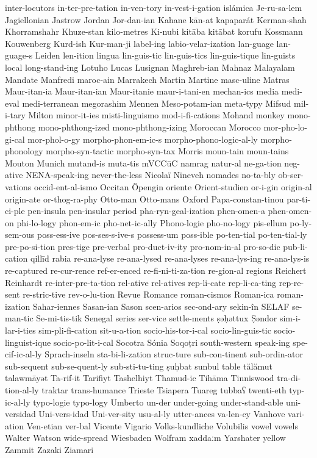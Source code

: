 {inter-locutors
in-ter-pre-tation
in-ven-tory
in-vest-i-gation
islámica
Je-ru-sa-lem
Jagiellonian
Jastrow
Jordan
Jor-dan-ian
Kahane
kān-at
kapaparát
Kerman-shah
Khorramshahr
Khuze-stan
kilo-metres
Ki-nubi
kitāba
kitābat
korufu
Kossmann
Kouwenberg
Kurd-ish
Kur-man-ji
label-ing
labio-velar-ization
lan-guage
lan-guage-s
Leiden
len-ition
lingua
lin-guis-tic
lin-guis-tics
lin-guis-tique
lin-guists
local
long-stand-ing
Lotuho
Lucas
Lusignan
Maghreb-ian
Mahnaz
Malayalam
Mandate
Manfredi
maroc-ain
Marrakech
Martin
Martine
masc-uline
Matras
Maur-itan-ia
Maur-itan-ian
Maur-itanie
maur-i-tani-en
mechan-ics
media
medi-eval
medi-terranean
megorashim
Mennen
Meso-potam-ian
meta-typy
Mifsud
mil-i-tary
Milton
minor-it-ies
misti-linguismo
mod-i-fi-cations
Mohand
monkey
mono-phthong
mono-phthong-ized
mono-phthong-izing
Moroccan
Morocco
mor-pho-lo-gi-cal
mor-phol-o-gy
morpho-phon-em-ic-s
morpho-phono-logic-al-ly
morpho-phonology
morpho-syn-tactic
morpho-syn-tax
Morris
moun-tain
moun-tains
Mouton
Munich
mutand-is
muta-tis
mVCCūC
namrag
natur-al
ne-ga-tion
neg-ative
NENA-speak-ing
never-the-less
Nicolaï
Nineveh
nomades
no-ta-bly
ob-ser-vations
occid-ent-al-ismo
Occitan
Öpengin
oriente
Orient-studien
or-i-gin
origin-al
origin-ate
or-thog-ra-phy
Otto-man
Otto-mans
Oxford
Papa-constan-tinou
par-ti-ci-ple
pen-insula
pen-insular
period
pha-ryn-geal-ization
phen-omen-a
phen-omen-on
phi-lo-logy
phon-em-ic
pho-net-ic-ally
Phono-logie
pho-no-logy
pis-ellum
po-ly-sem-ous
poss-ess-ive
pos-ses-s-ive-s
possess-um
poss-ible
po-ten-tial
po-ten-tial-ly
pre-po-si-tion
pres-tige
pre-verbal
pro-duct-iv-ity
pro-nom-in-al
pro-so-dic
pub-li-cation
qillīd
rabia
re-ana-lyse
re-ana-lysed
re-ana-lyses
re-ana-lys-ing
re-ana-lys-is
re-captured
re-cur-rence
ref-er-enced
re-fi-ni-ti-za-tion
re-gion-al
regions
Reichert
Reinhardt
re-inter-pre-ta-tion
rel-ative
rel-atives
rep-li-cate
rep-li-ca-ting
rep-re-sent
re-stric-tive
rev-o-lu-tion
Revue
Romance
roman-cismos
Roman-ica
roman-ization
Sahar-iennes
Sasan-ian
Sason
scen-arios
sec-ond-ary
sekin-în
SELAF
se-man-tic
Se-mi-tis-tik
Senegal
series
ser-vice
settle-ments
ṣəḥəttux
Ṣəndor
sim-i-lar-i-ties
sim-pli-fi-cation
sit-u-a-tion
socio-his-tor-i-cal
socio-lin-guis-tic
socio-linguist-ique
socio-po-lit-i-cal
Socotra
Sónia
Soqoṭri
south-western
speak-ing
spe-cif-ic-al-ly
Sprach-inseln
sta-bi-li-zation
struc-ture
sub-con-tinent
sub-ordin-ator
sub-sequent
sub-se-quent-ly
sub-sti-tu-ting
ṣuḥbat
sunbul
table
tălămut
talawmāyət
Ta-rif-it
Tarifiyt
Tashelhiyt
Thamud-ic
Tihāma
Tinniswood
tra-di-tion-al-ly
traktar
trans-humance
Trieste
Tsiapera
Tuareg
tubbaʕ
twenti-eth
typ-ic-al-ly
typo-logie
typo-logy
Umberto
un-der
under-going
under-stand-able
uni-versidad
Uni-vers-idad
Uni-ver-sity
usu-al-ly
utter-ances
va-len-cy
Vanhove
vari-ation
Ven-etian
ver-bal
Vicente
Vigario
Volks-kundliche
Volubilis
vowel
vowels
Walter
Watson
wide-spread
Wiesbaden
Wolfram
xaddaːm
Yarshater
yellow
Zammit
Zazaki
Ziamari
}
